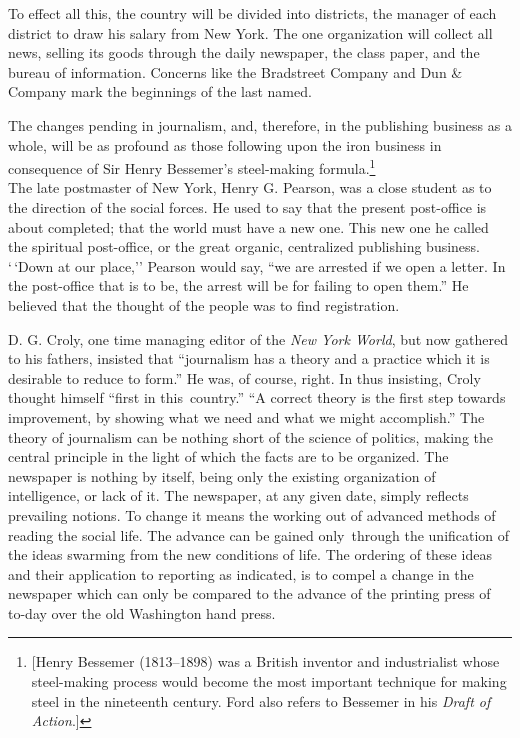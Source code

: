 \documentclass[openany,nobib]{tufte-book}
\begin{document}
To effect all this, the country will be divided into districts, the
manager of each district to draw his salary from New York. The one
organization will collect all news, selling its goods through the daily
newspaper, the class paper, and the bureau of information. Concerns like
the Bradstreet Company and Dun \& Company mark the beginnings of the
last named.~

The changes pending in journalism, and, therefore, in the publishing
business as a whole, will be as profound as those following upon the
iron business in consequence of Sir Henry Bessemer's steel-making
formula.\footnote{{[}Henry Bessemer (1813--1898) was a British inventor
  and industrialist whose steel-making process would become the most
  important technique for making steel in the nineteenth century. Ford
  also refers to Bessemer in his \emph{Draft of Action}.{]}}\\\noindent The late
postmaster of New York, Henry G. Pearson, was a close student as to the
direction of the social forces. He used to say that the present
post-office is about completed; that the world must have a new one. This
new one he called the spiritual post-office, or the great organic,
centralized publishing business. `\,`Down at our place,'' Pearson would
say, ``we are arrested if we open a letter. In the post-office that is
to be, the arrest will be for failing to open them.'' He believed that
the thought of the people was to find registration.~

D. G. Croly, one time managing editor of the \emph{New York World}, but
now gathered to his fathers, insisted that ``journalism has a theory and
a practice which it is desirable to reduce to form.'' He was, of course,
right. In thus insisting, Croly thought himself ``first in
this~country.'' ``A correct theory is the first step towards
improvement, by showing what we need and what we might accomplish.'' The
theory of journalism can be nothing short of the science of politics,
making the central principle in the light of which the facts are to be
organized. The newspaper is nothing by itself, being only the existing
organization of intelligence, or lack of it. The newspaper, at any given
date, simply reflects prevailing notions. To change it means the working
out of advanced methods of reading the social life. The advance can be
gained only~through the unification of the ideas swarming from the new
conditions of life. The ordering of these ideas and their application to
reporting as indicated, is to compel a change in the newspaper which can
only be compared to the advance of the printing press of to-day over the
old Washington hand press.~
\end{document}
